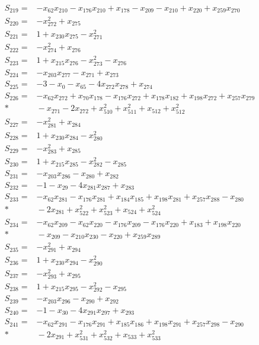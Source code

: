 \begin{align*}
S_{219}={}&-x_{62}x_{210}-x_{176}x_{210}+x_{178}-x_{209}-x_{210}+x_{220}+x_{259}x_{270}\\[3pt]
S_{220}={}&-x_{272}^{2}+x_{275}\\[3pt]
S_{221}={}&1+x_{230}x_{275}-x_{271}^{2}\\[3pt]
S_{222}={}&-x_{274}^{2}+x_{276}\\[3pt]
S_{223}={}&1+x_{215}x_{276}-x_{273}^{2}-x_{276}\\[3pt]
S_{224}={}&-x_{203}x_{277}-x_{271}+x_{273}\\[3pt]
S_{225}={}&-3-x_{0}-x_{65}-4x_{272}x_{278}+x_{274}\\[3pt]
S_{226}={}&-x_{62}x_{272}+x_{70}x_{178}-x_{176}x_{272}+x_{178}x_{182}+x_{198}x_{272}+x_{257}x_{279}\\*
&{}-x_{271}-2x_{272}+x_{510}^{2}+x_{511}^{2}+x_{512}+x_{512}^{2}\\[3pt]
S_{227}={}&-x_{281}^{2}+x_{284}\\[3pt]
S_{228}={}&1+x_{230}x_{284}-x_{280}^{2}\\[3pt]
S_{229}={}&-x_{283}^{2}+x_{285}\\[3pt]
S_{230}={}&1+x_{215}x_{285}-x_{282}^{2}-x_{285}\\[3pt]
S_{231}={}&-x_{203}x_{286}-x_{280}+x_{282}\\[3pt]
S_{232}={}&-1-x_{29}-4x_{281}x_{287}+x_{283}\\[3pt]
S_{233}={}&-x_{62}x_{281}-x_{176}x_{281}+x_{184}x_{185}+x_{198}x_{281}+x_{257}x_{288}-x_{280}\\*
&{}-2x_{281}+x_{522}^{2}+x_{523}^{2}+x_{524}+x_{524}^{2}\\[3pt]
S_{234}={}&-x_{62}x_{209}-x_{62}x_{220}-x_{176}x_{209}-x_{176}x_{220}+x_{183}+x_{198}x_{220}\\*
&{}-x_{209}-x_{210}x_{230}-x_{220}+x_{259}x_{289}\\[3pt]
S_{235}={}&-x_{291}^{2}+x_{294}\\[3pt]
S_{236}={}&1+x_{230}x_{294}-x_{290}^{2}\\[3pt]
S_{237}={}&-x_{293}^{2}+x_{295}\\[3pt]
S_{238}={}&1+x_{215}x_{295}-x_{292}^{2}-x_{295}\\[3pt]
S_{239}={}&-x_{203}x_{296}-x_{290}+x_{292}\\[3pt]
S_{240}={}&-1-x_{30}-4x_{291}x_{297}+x_{293}\\[3pt]
S_{241}={}&-x_{62}x_{291}-x_{176}x_{291}+x_{185}x_{186}+x_{198}x_{291}+x_{257}x_{298}-x_{290}\\*
&{}-2x_{291}+x_{531}^{2}+x_{532}^{2}+x_{533}+x_{533}^{2}\\[3pt]

\end{align*}
